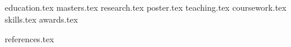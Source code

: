 \documentclass[letterpaper,11pt]{article}
\begin{document}

 {

    
    \href{https://vasudha-kulkarni.github.io/}{\faGlobe} 
    \href{https://github.com/vasudha-kulkarni}{\faGithub}
    \href{https://twitter.com/vkulkarni_2081}{\faTwitter}
    
}
    


{education.tex}
{masters.tex}
{research.tex}
{poster.tex}
{teaching.tex}
{coursework.tex}
{skills.tex}
{awards.tex}



{references.tex}
\end{document}
